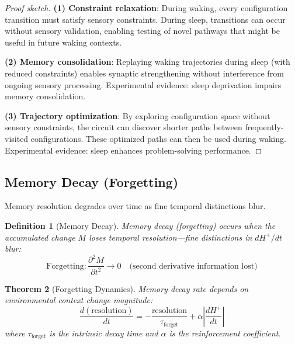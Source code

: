 \documentclass[aps,prd,twocolumn,superscriptaddress,floatfix,nofootinbib]{revtex4-2}
\newtheorem{theorem}{Theorem}[section]
\newtheorem{definition}[theorem]{Definition}
\theoremstyle{remark}
\begin{document}
\begin{proof}[Proof sketch]
\textbf{(1) Constraint relaxation}: During waking, every configuration transition must satisfy sensory constraints. During sleep, transitions can occur without sensory validation, enabling testing of novel pathways that might be useful in future waking contexts.

\textbf{(2) Memory consolidation}: Replaying waking trajectories during sleep (with reduced constraints) enables synaptic strengthening without interference from ongoing sensory processing. Experimental evidence: sleep deprivation impairs memory consolidation.

\textbf{(3) Trajectory optimization}: By exploring configuration space without sensory constraints, the circuit can discover shorter paths between frequently-visited configurations. These optimized paths can then be used during waking. Experimental evidence: sleep enhances problem-solving performance.
\end{proof}

\subsection{Memory Decay (Forgetting)}

Memory resolution degrades over time as fine temporal distinctions blur.

\begin{definition}[Memory Decay]
\label{def:forgetting}
Memory decay (forgetting) occurs when the accumulated change $M$ loses temporal resolution—fine distinctions in $dH^+/dt$ blur:
\begin{equation}
\text{Forgetting}: \frac{\partial^2 M}{\partial t^2} \to 0 \quad \text{(second derivative information lost)}
\end{equation}
\end{definition}

\begin{theorem}[Forgetting Dynamics]
\label{thm:forgetting}
Memory decay rate depends on environmental context change magnitude:
\begin{equation}
\frac{d(\text{resolution})}{dt} = -\frac{\text{resolution}}{\tau_{\text{forget}}} + \alpha \left|\frac{dH^+}{dt}\right|
\end{equation}
where $\tau_{\text{forget}}$ is the intrinsic decay time and $\alpha$ is the reinforcement coefficient.
\end{theorem}
\end{document}
